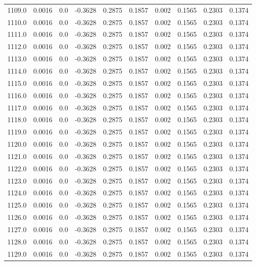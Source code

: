 \begin{longtable}{lrrrrrrrrr}
1109.0 & 0.0016 & 0.0 & -0.3628 & 0.2875 & 0.1857 & 0.002 & 0.1565 & 0.2303 & 0.1374 \\
1110.0 & 0.0016 & 0.0 & -0.3628 & 0.2875 & 0.1857 & 0.002 & 0.1565 & 0.2303 & 0.1374 \\
1111.0 & 0.0016 & 0.0 & -0.3628 & 0.2875 & 0.1857 & 0.002 & 0.1565 & 0.2303 & 0.1374 \\
1112.0 & 0.0016 & 0.0 & -0.3628 & 0.2875 & 0.1857 & 0.002 & 0.1565 & 0.2303 & 0.1374 \\
1113.0 & 0.0016 & 0.0 & -0.3628 & 0.2875 & 0.1857 & 0.002 & 0.1565 & 0.2303 & 0.1374 \\
1114.0 & 0.0016 & 0.0 & -0.3628 & 0.2875 & 0.1857 & 0.002 & 0.1565 & 0.2303 & 0.1374 \\
1115.0 & 0.0016 & 0.0 & -0.3628 & 0.2875 & 0.1857 & 0.002 & 0.1565 & 0.2303 & 0.1374 \\
1116.0 & 0.0016 & 0.0 & -0.3628 & 0.2875 & 0.1857 & 0.002 & 0.1565 & 0.2303 & 0.1374 \\
1117.0 & 0.0016 & 0.0 & -0.3628 & 0.2875 & 0.1857 & 0.002 & 0.1565 & 0.2303 & 0.1374 \\
1118.0 & 0.0016 & 0.0 & -0.3628 & 0.2875 & 0.1857 & 0.002 & 0.1565 & 0.2303 & 0.1374 \\
1119.0 & 0.0016 & 0.0 & -0.3628 & 0.2875 & 0.1857 & 0.002 & 0.1565 & 0.2303 & 0.1374 \\
1120.0 & 0.0016 & 0.0 & -0.3628 & 0.2875 & 0.1857 & 0.002 & 0.1565 & 0.2303 & 0.1374 \\
1121.0 & 0.0016 & 0.0 & -0.3628 & 0.2875 & 0.1857 & 0.002 & 0.1565 & 0.2303 & 0.1374 \\
1122.0 & 0.0016 & 0.0 & -0.3628 & 0.2875 & 0.1857 & 0.002 & 0.1565 & 0.2303 & 0.1374 \\
1123.0 & 0.0016 & 0.0 & -0.3628 & 0.2875 & 0.1857 & 0.002 & 0.1565 & 0.2303 & 0.1374 \\
1124.0 & 0.0016 & 0.0 & -0.3628 & 0.2875 & 0.1857 & 0.002 & 0.1565 & 0.2303 & 0.1374 \\
1125.0 & 0.0016 & 0.0 & -0.3628 & 0.2875 & 0.1857 & 0.002 & 0.1565 & 0.2303 & 0.1374 \\
1126.0 & 0.0016 & 0.0 & -0.3628 & 0.2875 & 0.1857 & 0.002 & 0.1565 & 0.2303 & 0.1374 \\
1127.0 & 0.0016 & 0.0 & -0.3628 & 0.2875 & 0.1857 & 0.002 & 0.1565 & 0.2303 & 0.1374 \\
1128.0 & 0.0016 & 0.0 & -0.3628 & 0.2875 & 0.1857 & 0.002 & 0.1565 & 0.2303 & 0.1374 \\
1129.0 & 0.0016 & 0.0 & -0.3628 & 0.2875 & 0.1857 & 0.002 & 0.1565 & 0.2303 & 0.1374 \\

\end{longtable}
